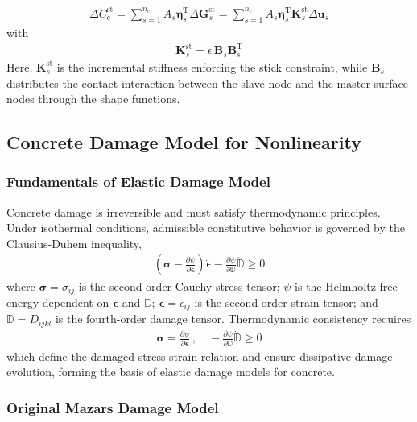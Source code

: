 \documentclass[review, authoryear, 12pt]{elsarticle}
\begin{document}
\begin{align}
    \Delta C_{\text{c}}^{\text{st}} = \sum_{s=1}^{n_{\text{c}}} A_s \bm{\eta}_s^{\text{T}} \Delta \mathbf{G}_s^{\text{st}}
    = \sum_{s=1}^{n_{\text{c}}} A_s \bm{\eta}_s^{\text{T}} \mathbf{K}_s^{\text{st}} \Delta \mathbf{u}_s %
\end{align}
with
\begin{align}
    \mathbf{K}_s^{\text{st}} = \epsilon \, \mathbf{B}_s \mathbf{B}_s^{\text{T}} %
\end{align}
Here, $\mathbf{K}_s^{\text{st}}$ is the incremental stiffness enforcing the stick constraint, while $\mathbf{B}_s$ distributes the contact interaction between the slave node and the master-surface nodes through the shape functions.

\subsection{Concrete Damage Model for Nonlinearity}
\label{subsec:concrete_damage}

\subsubsection{Fundamentals of Elastic Damage Model}

Concrete damage is irreversible and must satisfy thermodynamic principles. Under isothermal conditions, admissible constitutive behavior is governed by the Clausius-Duhem inequality,
\begin{align}
    \left( \bm{\sigma} - \frac{\partial \psi}{\partial \bm{\epsilon}} \right) \dot{\bm{\epsilon}} - \frac{\partial \psi}{\partial \mathbb{D}} \dot{\mathbb{D}} \geq 0 %
\end{align}
where $\bm{\sigma} = \sigma_{ij}$ is the second-order Cauchy stress tensor; $\psi$ is the Helmholtz free energy dependent on $\bm{\epsilon}$ and $\mathbb{D}$; $\bm{\epsilon} = \epsilon_{ij}$ is the second-order strain tensor; and $\mathbb{D} = D_{ijkl}$ is the fourth-order damage tensor. Thermodynamic consistency requires
\begin{align}
    \bm{\sigma} = \frac{\partial \psi}{\partial \bm{\epsilon}} \,, \quad
    -\frac{\partial \psi}{\partial \mathbb{D}} \dot{\mathbb{D}} \geq 0
\end{align}
which define the damaged stress-strain relation and ensure dissipative damage evolution, forming the basis of elastic damage models for concrete.

\subsubsection{Original Mazars Damage Model}
\end{document}
